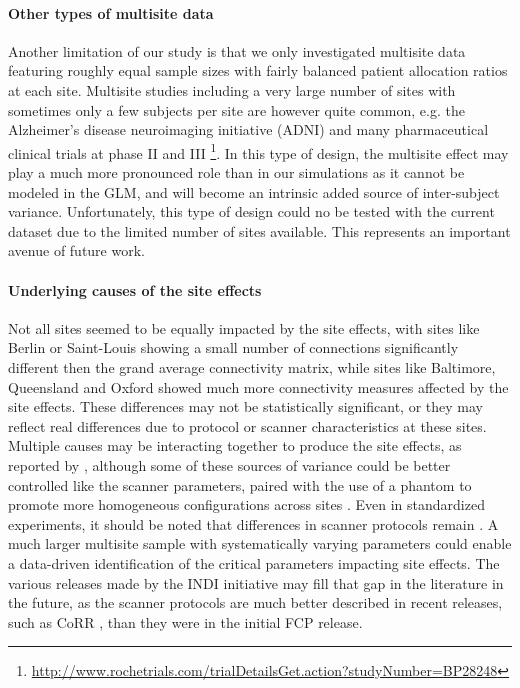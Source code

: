 \documentclass[authoryear]{elsarticle}
\begin{document}
\paragraph{Other types of multisite data} Another limitation of our study is that we only investigated multisite data featuring roughly equal sample sizes with fairly balanced patient allocation ratios at each site. Multisite studies including a very large number of sites with sometimes only a few subjects per site are however quite common, e.g. the Alzheimer's disease neuroimaging initiative (ADNI) \citep{Mueller2005} and many pharmaceutical clinical trials at phase II and III \footnote{\url{http://www.rochetrials.com/trialDetailsGet.action?studyNumber=BP28248}}. In this type of design, the multisite effect may play a much more pronounced role than in our simulations as it cannot be modeled in the GLM, and will become an intrinsic added source of inter-subject variance. Unfortunately, this type of design could no be tested with the current dataset due to the limited number of sites available. This represents an important avenue of future work. 

\paragraph{Underlying causes of the site effects}
Not all sites seemed to be equally impacted by the site effects, with sites like Berlin or Saint-Louis showing a small number of connections significantly different then the grand average connectivity matrix, while sites like Baltimore, Queensland and Oxford showed much more connectivity measures affected by the site effects. These differences may not be statistically significant, or they may reflect real differences due to protocol or scanner characteristics at these sites. Multiple causes may be interacting together to produce the site effects, as reported by \cite{Yan2013a}, although some of these sources of variance could be better controlled like the scanner parameters, paired with the use of a phantom to promote more homogeneous configurations across sites \citep{Friedman2006,Friedman2006a,Glover2012,Friedman2008}. Even in standardized experiments, it should be noted that differences in scanner protocols remain \citep{Brown2011}. A much larger multisite sample with systematically varying parameters could enable a data-driven identification of the critical parameters impacting site effects. The various releases made by the INDI initiative may fill that gap in the literature in the future, as the scanner protocols are much better described in recent releases, such as CoRR \citep{Zuo2014-ec}, than they were in the initial FCP release.
\end{document}
